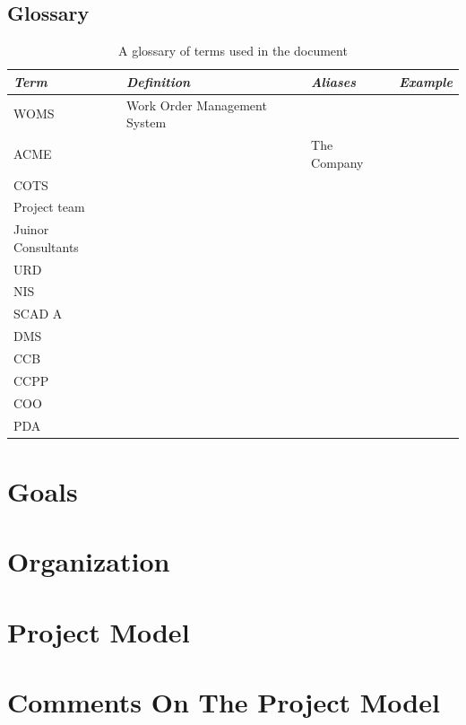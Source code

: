 \documentclass[a4paper]{article}
\begin{document}
\subsection{Glossary}
\label{sub:glossary}

\begin{table}[!ht]
	\centering
	\begin{tabular}{|p{2cm}| p{3cm} |l| p{3cm} |}
	\hline
		\textit{Term} & \textit{Definition} & \textit{Aliases} & \textit{Example} \\
	\hline
		
		WOMS	 & Work Order Management System & & \\
		ACME	 & & The Company & \\	
		COTS	 & & & \\		
		Project team & & & \\			
		Juinor Consultants	& & & \\		
		URD & & & \\
		NIS	& & & \\		
		SCAD	A & & & \\ 			
		DMS & & & \\
		CCB	& & & \\
		CCPP	 & & & \\
		COO	& & & \\
		PDA	& & & \\

	\hline
	
	\end{tabular}
	\caption{A glossary of terms used in the document}
\end{table}

\section{Goals} 
\label{sec:goals}


\section{Organization}
\label{sec:organization}


\section{Project Model} 
\label{sec:project_model}


\section{Comments On The Project Model} 
\label{sec:comments_on_the_project_model}
\end{document}
